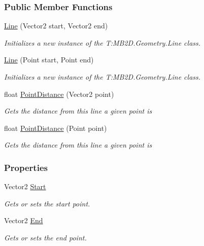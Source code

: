 \subsubsection*{Public Member Functions}
\begin{DoxyCompactItemize}
\item 
\hyperlink{class_m_b2_d_1_1_geometry_1_1_line_a72a1804c7d045920d82ed26689fe10c6}{Line} (Vector2 start, Vector2 end)
\begin{DoxyCompactList}\small\item\em Initializes a new instance of the T\+:\+M\+B2\+D.\+Geometry.\+Line class. \end{DoxyCompactList}\item 
\hyperlink{class_m_b2_d_1_1_geometry_1_1_line_a7c3e02a1c56c94be46ce9ad55eaa87b8}{Line} (Point start, Point end)
\begin{DoxyCompactList}\small\item\em Initializes a new instance of the T\+:\+M\+B2\+D.\+Geometry.\+Line class. \end{DoxyCompactList}\item 
float \hyperlink{class_m_b2_d_1_1_geometry_1_1_line_ae5d02b1abab30bf1c8f471df2061749f}{Point\+Distance} (Vector2 point)
\begin{DoxyCompactList}\small\item\em Gets the distance from this line a given point is \end{DoxyCompactList}\item 
float \hyperlink{class_m_b2_d_1_1_geometry_1_1_line_a5cbeb68ba1f9f2c8a191f4593a234fa8}{Point\+Distance} (Point point)
\begin{DoxyCompactList}\small\item\em Gets the distance from this line a given point is \end{DoxyCompactList}\end{DoxyCompactItemize}
\subsubsection*{Properties}
\begin{DoxyCompactItemize}
\item 
Vector2 \hyperlink{class_m_b2_d_1_1_geometry_1_1_line_aa02111d13427d3b169c73bb354f7bb53}{Start}
\begin{DoxyCompactList}\small\item\em Gets or sets the start point. \end{DoxyCompactList}\item 
Vector2 \hyperlink{class_m_b2_d_1_1_geometry_1_1_line_a17eb89f60f0bb666884655d4efd18be5}{End}
\begin{DoxyCompactList}\small\item\em Gets or sets the end point. \end{DoxyCompactList}\end{DoxyCompactItemize}


